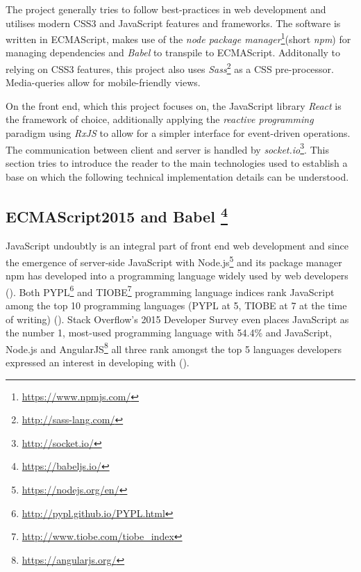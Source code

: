 The project generally tries to follow best-practices in web development and utilises modern CSS3 and JavaScript features and frameworks. The software is written in ECMA\-Script, makes use of the \emph{node package manager}\footnote{\url{https://www.npmjs.com/}}(short \emph{npm}) for managing dependencies and \emph{Babel} to transpile to ECMA\-Script. Additonally to relying on CSS3 features, this project also uses \emph{Sass}\footnote{\url{http://sass-lang.com/}} as a CSS pre-processor. Media-queries allow for mobile-friendly views.

On the front end, which this project focuses on, the JavaScript library \emph{React} is the framework of choice, additionally applying the \emph{reactive programming} paradigm using \emph{RxJS} to allow for a simpler interface for event-driven operations. The communication between client and server is handled by \emph{socket.io}\footnote{\url{http://socket.io/}}.
This section tries to introduce the reader to the main technologies used to establish a base on which the following technical implementation details can be understood.

\subsection[ECMAScript2015 and Babel]%
             {ECMAScript2015 and Babel%
             \protect\footnote{\url{https://babeljs.io/}}}%
\label{sec:implementation-technologies-es6}
JavaScript undoubtly is an integral part of front end web development and since the emergence of server-side JavaScript with Node.js\footnote{\url{https://nodejs.org/en/}} and its package manager npm has developed into a programming language widely used by web developers (\cite{gpm-meta-transcompiler}). Both PYPL\footnote{\url{http://pypl.github.io/PYPL.html}} and TIOBE\footnote{\url{http://www.tiobe.com/tiobe_index}} programming language indices rank JavaScript among the top 10 programming languages (PYPL at 5, TIOBE at 7 at the time of writing) (\cite{gpm-meta-transcompiler}). Stack Overflow's 2015 Developer Survey even places JavaScript as the number 1, most-used programming language with 54.4\% and JavaScript, Node.js and AngularJS\footnote{\url{https://angularjs.org/}} all three rank amongst the top 5 languages developers expressed an interest in developing with (\cite{stackoverflow-developer-survey}).

